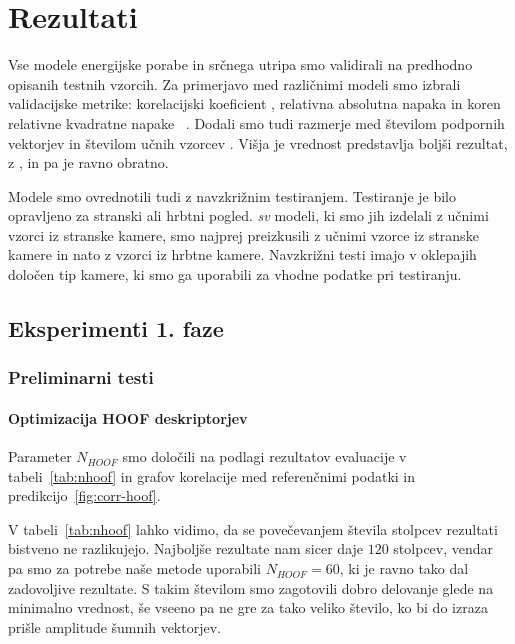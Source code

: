 \chapter{Rezultati}\label{sec:rezultati}
Vse modele energijske porabe in srčnega utripa smo validirali na predhodno opisanih testnih vzorcih. Za primerjavo med različnimi modeli smo izbrali validacijske metrike: korelacijski koeficient \corr, relativna absolutna napaka \rae in koren relativne kvadratne napake \rrse~\cite{witten2005data}. Dodali smo tudi razmerje med številom podpornih vektorjev in številom učnih vzorcev \nsv. Višja je vrednost \corr predstavlja boljši rezultat, z \rae, \rrse in \nsv pa je ravno obratno.

Modele smo ovrednotili tudi z navzkrižnim testiranjem. Testiranje je bilo opravljeno za stranski ali hrbtni pogled. \textit{sv} modeli, ki smo jih izdelali z učnimi vzorci iz stranske kamere, smo najprej preizkusili z učnimi vzorce iz stranske kamere in nato z vzorci iz hrbtne kamere. Navzkrižni testi imajo v oklepajih določen tip kamere, ki smo ga uporabili za vhodne podatke pri testiranju.
















\section{Eksperimenti 1. faze}


\subsection{Preliminarni testi}

\subsubsection{Optimizacija HOOF deskriptorjev}\label{sec:rezultati-optimizacija-hoof}
Parameter $N_{HOOF}$ smo določili na podlagi rezultatov evaluacije v tabeli~\ref{tab:nhoof} in grafov korelacije med referenčnimi podatki in predikcijo~\ref{fig:corr-hoof}.

V tabeli~\ref{tab:nhoof} lahko vidimo, da se povečevanjem števila stolpcev rezultati bistveno ne razlikujejo. Najboljše rezultate nam sicer daje $120$ stolpcev, vendar pa smo za potrebe naše metode uporabili $N_{HOOF}=60$, ki je ravno tako dal zadovoljive rezultate. S takim številom smo zagotovili dobro delovanje glede na minimalno vrednost, še vseeno pa ne gre za tako veliko število, ko bi do izraza prišle amplitude šumnih vektorjev.

